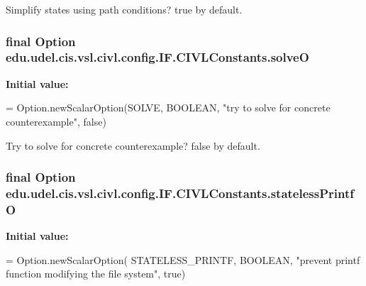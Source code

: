Simplify states using path conditions? true by default. 

\hypertarget{classedu_1_1udel_1_1cis_1_1vsl_1_1civl_1_1config_1_1IF_1_1CIVLConstants_aca085e9bab6d01460182843a9cfb180b}{}
\subsubsection[{solve\+O}]{\setlength{\rightskip}{0pt plus 5cm}final Option edu.\+udel.\+cis.\+vsl.\+civl.\+config.\+I\+F.\+C\+I\+V\+L\+Constants.\+solve\+O\hspace{0.3cm}{\ttfamily [static]}}\label{classedu_1_1udel_1_1cis_1_1vsl_1_1civl_1_1config_1_1IF_1_1CIVLConstants_aca085e9bab6d01460182843a9cfb180b}
{\bfseries Initial value\+:}
\begin{DoxyCode}
= Option.newScalarOption(SOLVE, BOOLEAN,
            \textcolor{stringliteral}{"try to solve for concrete counterexample"}, \textcolor{keyword}{false})
\end{DoxyCode}


Try to solve for concrete counterexample? false by default. 

\hypertarget{classedu_1_1udel_1_1cis_1_1vsl_1_1civl_1_1config_1_1IF_1_1CIVLConstants_a80dd816ccd1150a1b07315d0a029c165}{}
\subsubsection[{stateless\+Printf\+O}]{\setlength{\rightskip}{0pt plus 5cm}final Option edu.\+udel.\+cis.\+vsl.\+civl.\+config.\+I\+F.\+C\+I\+V\+L\+Constants.\+stateless\+Printf\+O\hspace{0.3cm}{\ttfamily [static]}}\label{classedu_1_1udel_1_1cis_1_1vsl_1_1civl_1_1config_1_1IF_1_1CIVLConstants_a80dd816ccd1150a1b07315d0a029c165}
{\bfseries Initial value\+:}
\begin{DoxyCode}
= Option.newScalarOption(
            STATELESS\_PRINTF, BOOLEAN,
            \textcolor{stringliteral}{"prevent printf function modifying the file system"}, \textcolor{keyword}{true})
\end{DoxyCode}


